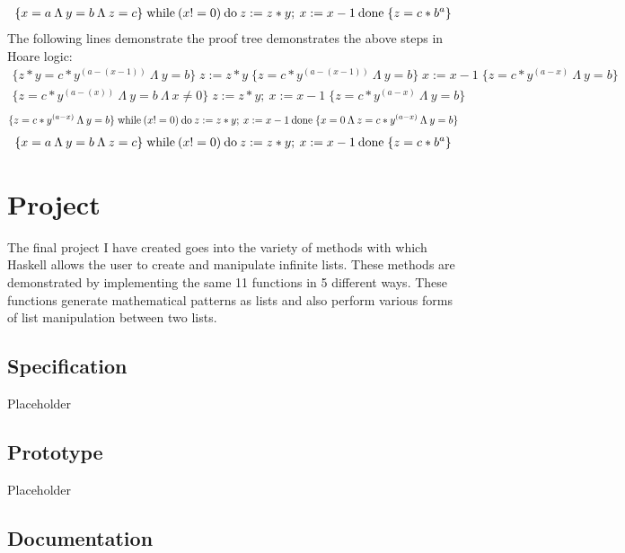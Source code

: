 \documentclass{article}
\theoremstyle{theorem}
\theoremstyle{definition}
\theoremstyle{remark}
\begin{document}
\begin{align*}
\{x = a \: \Lambda \: y = b \: \Lambda \: z = c\} \; {\rm while} \: (x!=0) \: {\rm do} \: z:=z*y; \: x:= x-1 \: {\rm done} \; \{z = c * b^a\}
\end{align*}
%
The following lines demonstrate the proof tree demonstrates the above steps in Hoare logic:
\begin{align*}
\{z*y = c * y^{(a - (x-1))} \: \Lambda \: y = b\} \; z:= z*y \; \{z = c * y^{(a - (x-1))} \: \Lambda \: y = b\} \; x:=x-1 \; \{z =c * y^{(a - x)} \: \Lambda \: y = b\}
\end{align*}
\begin{align*}
\{z = c * y^{(a - (x))} \: \Lambda \: y = b \: \Lambda \: x \neq 0\} \; z:= z*y; \: x:=x-1 \;  \{z =c * y^{(a - x)} \: \Lambda \: y = b\}
\end{align*}
\begin{align*}
 \{z =c * y^{(a - x)} \: \Lambda \: y = b\} \; {\rm while} \: (x!=0) \: {\rm do} \: z:=z*y; \: x:= x-1 \: {\rm done} \; \{x=0 \: \Lambda \: z =c * y^{(a - x)} \: \Lambda \: y = b\}
\end{align*}
\begin{align*}
\{x = a \: \Lambda \: y = b \: \Lambda \: z = c\} \; {\rm while} \: (x!=0) \: {\rm do} \: z:=z*y; \: x:= x-1 \: {\rm done} \; \{z = c * b^a\}
\end{align*}

\section{Project}

The final project I have created goes into the variety of methods with which Haskell allows the user to create and manipulate infinite lists. These methods are demonstrated by implementing the same 11 functions in 5 different ways. These functions generate mathematical patterns as lists and also perform various forms of list manipulation between two lists.

\subsection{Specification}
Placeholder

\subsection{Prototype}

Placeholder

\subsection{Documentation}
\end{document}
